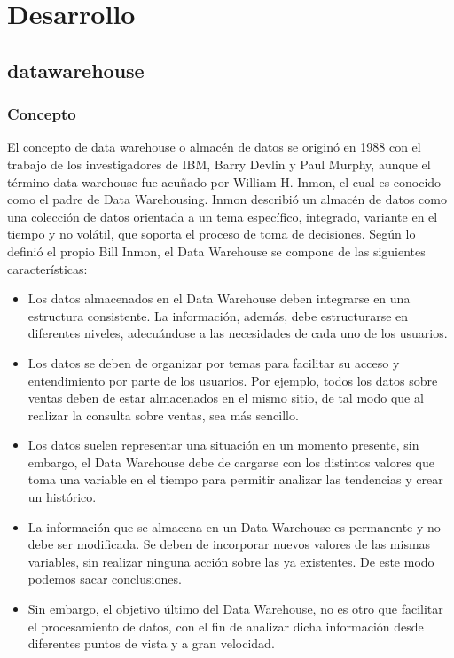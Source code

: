\documentclass[twoside,twocolumn]{article}
\begin{document}
\begin{center}

\end{center}

\section{Desarrollo}

\subsection{datawarehouse}
\subsubsection{Concepto}
El concepto de data warehouse o almacén de datos se originó en 1988 con el trabajo de los investigadores de IBM, Barry Devlin y Paul Murphy, aunque el término data warehouse fue acuñado por William H. Inmon, el cual es conocido como el padre de Data Warehousing. Inmon describió un almacén de datos como una colección de datos orientada a un tema específico, integrado, variante en el tiempo y no volátil, que soporta el proceso de toma de decisiones. 
Según lo definió el propio Bill Inmon, el Data Warehouse se compone de las siguientes características:
\begin{itemize}
    \item   Los datos almacenados en el Data Warehouse deben integrarse en una estructura consistente. La información, además, debe estructurarse en diferentes niveles, adecuándose a las necesidades de cada uno de los usuarios.
    \item   Los datos se deben de organizar por temas para facilitar su acceso y entendimiento por parte de los usuarios. Por ejemplo, todos los datos sobre ventas deben de estar almacenados en el mismo sitio, de tal modo que al realizar la consulta sobre ventas, sea más sencillo.
    \item   Los datos suelen representar una situación en un momento presente, sin embargo, el Data Warehouse debe de cargarse con los distintos valores que toma una variable en el tiempo para permitir analizar las tendencias y crear un histórico.
    \item   La información que se almacena en un Data Warehouse es permanente y no debe ser modificada. Se deben de incorporar nuevos valores de las mismas variables, sin realizar ninguna acción sobre las ya existentes. De este modo podemos sacar conclusiones.
    \item   Sin embargo, el objetivo último del Data Warehouse, no es otro que facilitar el procesamiento de datos, con el fin de analizar dicha información desde diferentes puntos de vista y a gran velocidad.
\end{itemize}
\end{document}
